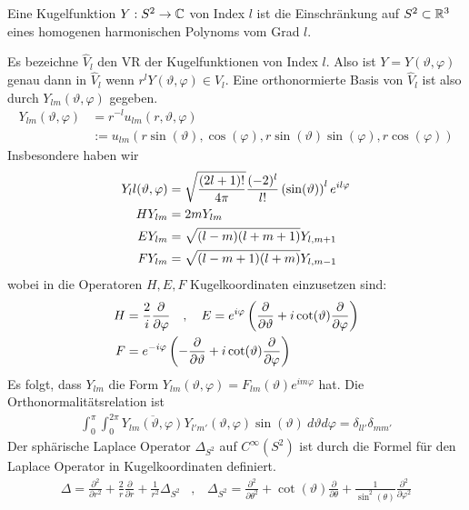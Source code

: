 \begin{definition}[Kugelfunktion]
    Eine Kugelfunktion $Y: S^2 \rightarrow \mathbb{C}$ von Index $l$ ist die
    Einschränkung auf $S^2 \subset \mathbb{R}^3$ eines homogenen harmonischen
    Polynoms vom Grad $l$.
\end{definition}

Es bezeichne $\hat{V}_l$ den VR der Kugelfunktionen von Index $l$. Also ist
$Y = Y(\vartheta,\varphi)$ genau dann in $\hat{V}_l$ wenn $r^l Y(\vartheta,
\varphi) \in V_l$. Eine orthonormierte Basis von $\hat{V}_l$ ist also durch
$Y_{lm}(\vartheta,\varphi)$ gegeben.
\begin{align*}
    Y_{lm} (\vartheta,\varphi) &= r^{-l} u_{lm}(r,\vartheta,\varphi)
    \\
    &:=
    u_{lm} (r \sin(\vartheta),\cos(\varphi),r \sin(\vartheta) \sin(\varphi),
    r \cos(\varphi))
\end{align*}
Insbesondere haben wir
\begin{align*}
    Y_ll(\vartheta,\varphi) &= \sqrt{\frac{(2l+1)!}{4 \pi}} \frac{(-2)^l}{l!} \left( \sin(\vartheta) \right)^l e^{il\varphi}
    \\
    H Y_{lm} &= 2 m Y_{lm}
    \\
    E Y_{lm} &= \sqrt{(l-m)(l+m+1)} Y_{l,m+1}
    \\
    F Y_{lm} &= \sqrt{(l-m+1)(l+m)} Y_{l,m-1}
\end{align*}
wobei in die Operatoren $H,E,F$ Kugelkoordinaten einzusetzen sind:
\begin{align*}
    H &= \frac{2}{i} \frac{\partial}{\partial \varphi}
    \hspace{10pt} , \hspace{10pt}
    E = e^{i \varphi} \left( \frac{\partial}{\partial \vartheta} + i \cot(\vartheta) \frac{\partial}{\partial \varphi} \right)
    \\
    F &= e^{-i \varphi} \left( - \frac{\partial}{\partial \vartheta} + i \cot(\vartheta) \frac{\partial}{\partial \varphi} \right)
\end{align*}
Es folgt, dass $Y_{lm}$ die Form $Y_{lm}(\vartheta,\varphi) = F_{lm}(\vartheta) e^{i m \varphi}$
hat. Die Orthonormalitätsrelation ist
\begin{align*}
    \int_0^\pi \int_0^{2 \pi} \overline{Y_{lm}(\vartheta,\varphi)} Y_{l'm'} (\vartheta,\varphi) \sin(\vartheta) \ d \vartheta d \varphi
    = \delta_{ll'} \delta_{mm'}
\end{align*}
Der sphärische Laplace Operator $\Delta_{S^2}$ auf $C^\infty (S^2)$ ist durch
die Formel für den Laplace Operator in Kugelkoordinaten definiert.
\begin{align*}
    \Delta = \frac{\partial^2}{\partial r^2} + \frac{2}{r} \frac{\partial}{\partial r} + \frac{1}{r^2} \Delta_{S^2}
    \hspace{10pt} , \hspace{10pt}
    \Delta_{S^2} = \frac{\partial^2}{\partial \theta^2} + \cot(\vartheta) \frac{\partial}{\partial \theta} + \frac{1}{\sin^2(\theta)} \frac{\partial^2}{\partial \varphi^2}
\end{align*}


